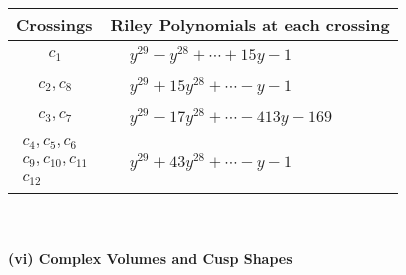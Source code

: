 \documentclass[1p]{elsarticle_modified}
\theoremstyle{definition}
\begin{document}
\begin{tabular}{m{50pt}|m{274pt}}
Crossings & \hspace{64pt}Riley Polynomials at each crossing \\
\hline $$\begin{aligned}c_{1}\end{aligned}$$&$\begin{aligned}
&y^{29}- y^{28}+\cdots+15 y-1
\end{aligned}$\\
\hline $$\begin{aligned}c_{2},c_{8}\end{aligned}$$&$\begin{aligned}
&y^{29}+15 y^{28}+\cdots- y-1
\end{aligned}$\\
\hline $$\begin{aligned}c_{3},c_{7}\end{aligned}$$&$\begin{aligned}
&y^{29}-17 y^{28}+\cdots-413 y-169
\end{aligned}$\\
\hline $$\begin{aligned}c_{4},c_{5},c_{6}\\c_{9},c_{10},c_{11}\\c_{12}\end{aligned}$$&$\begin{aligned}
&y^{29}+43 y^{28}+\cdots- y-1
\end{aligned}$\\
\hline
\end{tabular}\\~\\
\newpage\flushleft \textbf{(vi) Complex Volumes and Cusp Shapes}
\end{document}
